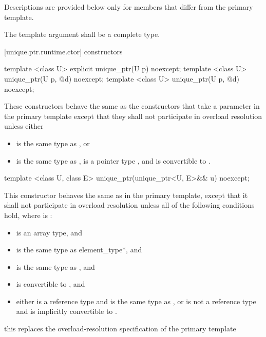 \pnum
Descriptions are provided below only for members that
differ from the primary template.

\pnum
The template argument  shall be a complete type.

[unique.ptr.runtime.ctor]{ constructors}

%
\begin{itemdecl}
template <class U> explicit unique_ptr(U p) noexcept;
template <class U> unique_ptr(U p, @\seebelow@ d) noexcept;
template <class U> unique_ptr(U p, @\seebelow@ d) noexcept;
\end{itemdecl}

\begin{itemdescr}
\pnum
These constructors behave the same as
the constructors that take a  parameter
in the primary template
except that they
shall not participate in overload resolution unless either

\begin{itemize}
\item {} is the same type as , or
\item {} is the same type as ,
       is a pointer type , and
       is convertible to .
\end{itemize}
\end{itemdescr}

%
\begin{itemdecl}
template <class U, class E>
  unique_ptr(unique_ptr<U, E>&& u) noexcept;
\end{itemdecl}

\begin{itemdescr}
\pnum
This constructor behaves the same as in the primary template,
except that it shall not participate in overload resolution
unless all of the following conditions hold,
where  is :

\begin{itemize}
\item {} is an array type, and
\item {} is the same type as {element_type*}, and
\item {} is the same type as , and
\item {} is convertible to , and
\item either  is a reference type and  is the same type as ,
      or  is not a reference type and  is implicitly convertible to .
\end{itemize}

\enternote
this replaces the overload-resolution specification of the primary template
\exitnote
\end{itemdescr}

